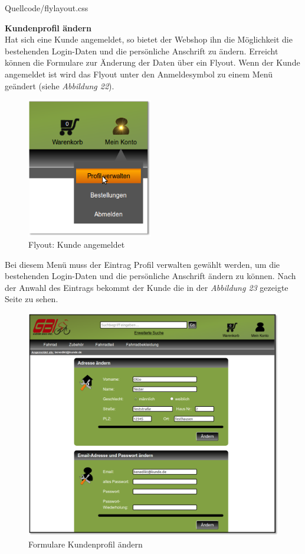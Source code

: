\begin{center}
	\begin{lstinputlisting}[language=CSS, caption={Loginbereich: Umsetzung des Flyouts mit CSS 2.0}]
		{Quellcode/flylayout.css}
	\end{lstinputlisting}
\end{center}

\textbf{Kundenprofil ändern}\\
Hat sich eine Kunde angemeldet, so bietet der Webshop ihn die Möglichkeit die bestehenden Login-Daten und die persönliche Anschrift zu ändern. Erreicht können die Formulare zur Änderung der Daten über ein Flyout. Wenn der Kunde angemeldet ist wird das Flyout unter den Anmeldesymbol zu einem Menü geändert (siehe \textit{Abbildung 22}).
\begin{figure}[H]
	\begin{center}
			\includegraphics[width=55mm]{Bilder/Abbildung15_Menue_Profil_aendern.png}
	\end{center}
	\caption{Flyout: Kunde angemeldet}
\end{figure}
Bei diesem Menü muss der Eintrag \glqq Profil verwalten\grqq{} gewählt werden, um die bestehenden Login-Daten und die persönliche Anschrift ändern zu können. Nach der Anwahl des Eintrags bekommt der Kunde die in der \textit{Abbildung 23} gezeigte Seite zu sehen.
\begin{figure}[H]
	\begin{center}
			\includegraphics[width=130mm]{Bilder/formulare_profil_aendern.png}
	\end{center}
	\caption{Formulare Kundenprofil ändern}
\end{figure}
